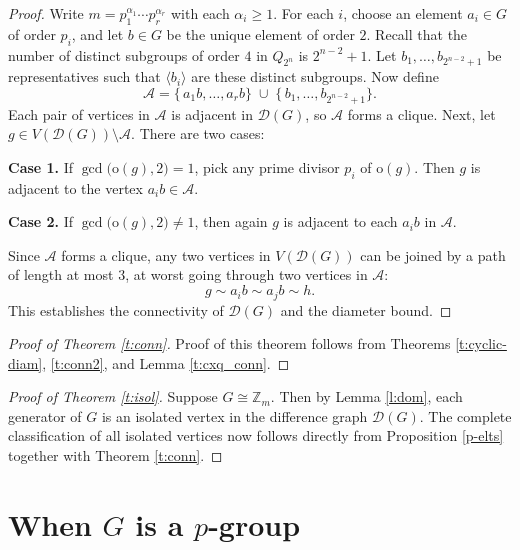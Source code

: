 \documentclass[12pt]{amsart}
\theoremstyle{plain}
\theoremstyle{remark}
\theoremstyle{definition}
\begin{document}
\begin{proof}
Write \(m = p_1^{\alpha_1} \cdots p_r^{\alpha_r}\) with each \(\alpha_i \ge 1\). For each \(i\), choose an element \(a_i \in G\) of order \(p_i\), and let \(b \in G\) be the unique element of order \(2\).
Recall that the number of distinct subgroups of order \(4\) in \(Q_{2^n}\) is \(2^{n-2} + 1\). Let \(b_1,\dots,b_{2^{n-2}+1}\) be representatives such that \(\langle b_i \rangle\) are these distinct subgroups.
Now define
\[
\mathcal{A} = \{\,a_1b, \ldots, a_rb\} \;\cup\; \{\,b_1,\ldots,b_{2^{n-2}+1}\}.
\]
Each pair of vertices in \(\mathcal{A}\) is adjacent in \(\mathcal{D}(G)\), so \(\mathcal{A}\) forms a clique. Next, let \(g \in V(\mathcal{D}(G)) \setminus \mathcal{A}\). There are two cases:

\medskip

\textbf{Case 1.} If \(\gcd\bigl(\mathrm{o}(g), 2\bigr)=1\), pick any prime divisor \(p_i\) of \(\mathrm{o}(g)\). Then \(g\) is adjacent to the vertex \(a_i b \in \mathcal{A}\).

\medskip

\textbf{Case 2.} If \(\gcd\bigl(\mathrm{o}(g), 2\bigr) \neq 1\), then again \(g\) is adjacent to each \(a_i b\) in \(\mathcal{A}\).

Since \(\mathcal{A}\) forms a clique, any two vertices in \(V(\mathcal{D}(G))\) can be joined by a path of length at most \(3\), at worst going through two vertices in \(\mathcal{A}\):
\[
g \sim a_i b \sim a_j b \sim h.
\]
This establishes the connectivity of \(\mathcal{D}(G)\) and the diameter bound.
\end{proof}


\begin{proof}[Proof of Theorem \ref{t:conn}]
Proof of this theorem follows from Theorems \ref{t:cyclic-diam}, \ref{t:conn2}, and Lemma \ref{t:cxq_conn}.
\end{proof}


\begin{proof}[Proof of Theorem \ref{t:isol}]
Suppose \(G \cong \mathbb{Z}_{m}\). Then by Lemma \ref{l:dom}, each generator of \(G\) is an isolated vertex in the difference graph \(\mathcal{D}(G)\).
The complete classification of all isolated vertices now follows directly from Proposition \ref{p-elts} together with Theorem \ref{t:conn}.
\end{proof}

\section{When $G$ is a $p$-group}
\label{sec:G-is-p-grp-diff-graph-empty}
\end{document}
